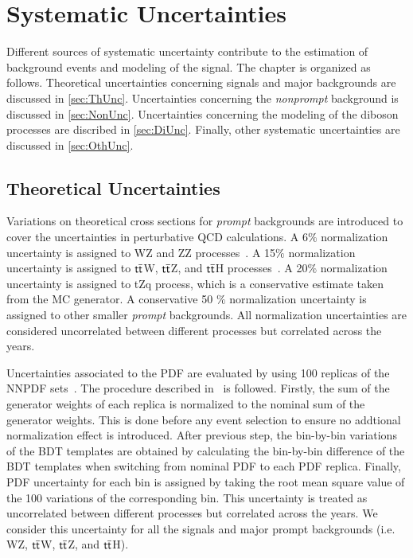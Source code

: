 \chapter{Systematic Uncertainties}
\label{chap:Systematics}

Different sources of systematic uncertainty contribute to the estimation of background events and modeling of the signal. The chapter is organized as follows. Theoretical uncertainties concerning signals and major backgrounds are discussed in \autoref{sec:ThUnc}. Uncertainties concerning the \emph{nonprompt} background is discussed in \autoref{sec:NonUnc}. Uncertainties concerning the modeling of the diboson processes are discribed in \autoref{sec:DiUnc}. Finally, other systematic uncertainties are discussed in \autoref{sec:OthUnc}.

\section{Theoretical Uncertainties}
\label{sec:ThUnc}

Variations on theoretical cross sections for \emph{prompt} backgrounds are introduced to cover the uncertainties in perturbative \ac{QCD} calculations.  A 6$\%$ normalization uncertainty is assigned to WZ and ZZ processes~\cite{Campbell:2011bn}. A 15$\%$ normalization uncertainty is assigned to $\textsf{t}\overline{\textsf{t}}$W, $\textsf{t}\overline{\textsf{t}}$Z, and $\textsf{t}\overline{\textsf{t}}$H processes~\cite{Frederix:2021agh,Kulesza:2020nfh}. A 20$\%$ normalization uncertainty is assigned to tZq process, which is a conservative estimate taken from the MC generator. A conservative 50 $\%$ normalization uncertainty is assigned to other smaller \emph{prompt} backgrounds. All normalization uncertainties are considered uncorrelated between different processes but correlated across the years. 

Uncertainties associated to the \ac{PDF} are evaluated by using 100 replicas of the NNPDF sets~\cite{NNPDF:2014otw,NNPDF:2017mvq}. The procedure described in~\cite{CMS:2012nsv} is followed. Firstly, the sum of the generator weights of each replica is normalized to the nominal sum of the generator weights. This is done before any event selection to ensure no addtional normalization effect is introduced. After previous step, the bin-by-bin variations of the \ac{BDT} templates are obtained by calculating the bin-by-bin difference of the \ac{BDT} templates when switching from nominal \ac{PDF} to each \ac{PDF} replica. Finally, \ac{PDF} uncertainty for each bin is assigned by taking the root mean square value of the 100 variations of the corresponding bin. This uncertainty is treated as uncorrelated between different processes but correlated across the years.  We consider this uncertainty for all the signals and major prompt backgrounds (i.e. WZ, $\textsf{t}\overline{\textsf{t}}$W, $\textsf{t}\overline{\textsf{t}}$Z, and $\textsf{t}\overline{\textsf{t}}$H).

